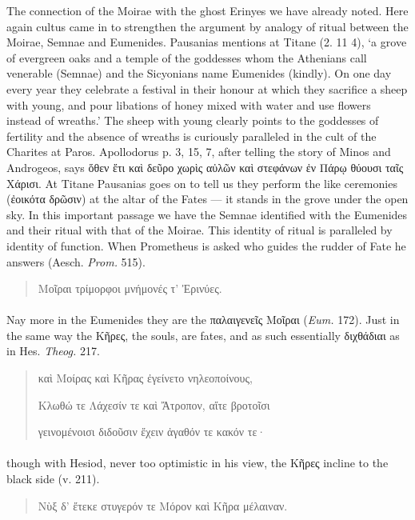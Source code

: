 \documentclass[a4paper, 11pt, oneside, polutonikogreek, english]{article}
\begin{document}
The connection of the Moirae with the ghost Erinyes we have already noted. Here again cultus came in to strengthen the argument by analogy of ritual between the Moirae, Semnae and Eumenides. Pausanias mentions at Titane (2. 11 4), `a grove of evergreen oaks and a temple of the goddesses whom the Athenians call venerable (Semnae) and the Sicyonians name Eumenides (kindly). On one day every year they celebrate a festival in their honour at which they sacrifice a sheep with young, and pour libations of honey mixed with water and use flowers instead of wreaths.' The sheep with young clearly points to the goddesses of fertility and the absence of wreaths is curiously paralleled in the cult of the Charites at Paros. Apollodorus p. 3, 15, 7, after telling the story of Minos and Androgeos, says ὅθεν ἔτι καὶ δεῦρο χωρὶς αὐλῶν καὶ στεφάνων ἐν Πάρῳ θύουσι ταῖς Χάρισι. At Titane Pausanias goes on to tell us they perform the like ceremonies (ἐοικότα δρῶσιν) at the altar of the Fates --- it stands in the grove under the open sky. In this important passage we have the Semnae identified with the Eumenides and their ritual with that of the Moirae. This identity of ritual is paralleled by identity of function. When Prometheus is asked who guides the rudder of Fate he answers (Aesch. \emph{Prom.} 515).
\begin{quotation}
\large
Μοῖραι τρίμορφοι μνήμονές τ' Ἐρινύες.
\end{quotation}
\paragraph{}
Nay more in the Eumenides they are the παλαιγενεῖς Μοῖραι (\emph{Eum.} 172). Just in the same way the Κῆρες, the souls, are fates, and as such essentially διχθάδιαι as in Hes. \emph{Theog.} 217.
\begin{quotation}
\large
καὶ Μοίρας καὶ Κῆρας ἐγείνετο νηλεοποίνους,

Κλωθώ τε Λάχεσίν τε καὶ Ἄτροπον, αἴτε βροτοῖσι

γεινομένοισι διδοῦσιν ἔχειν ἀγαθόν τε κακόν τε·
\end{quotation}
\paragraph{}
though with Hesiod, never too optimistic in his view, the Κῆρες incline to the black side (v. 211).
\begin{quotation}
\large
Νὺξ δ' ἔτεκε στυγερόν τε Μόρον καὶ Κῆρα μέλαιναν.
\end{quotation}
\end{document}
